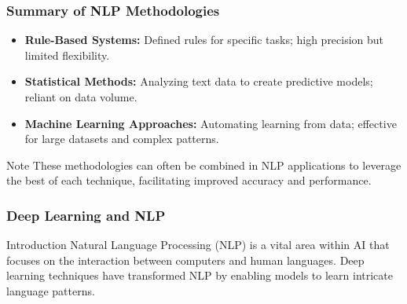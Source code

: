 \documentclass[aspectratio=169]{beamer}
\begin{document}
\begin{frame}[fragile]
    \frametitle{Summary of NLP Methodologies}
    \begin{itemize}
        \item \textbf{Rule-Based Systems:} Defined rules for specific tasks; high precision but limited flexibility.
        \item \textbf{Statistical Methods:} Analyzing text data to create predictive models; reliant on data volume.
        \item \textbf{Machine Learning Approaches:} Automating learning from data; effective for large datasets and complex patterns.
    \end{itemize}
    \begin{block}{Note}
        These methodologies can often be combined in NLP applications to leverage the best of each technique, facilitating improved accuracy and performance.
    \end{block}
\end{frame}

\begin{frame}[fragile]
    \frametitle{Deep Learning and NLP}
    \begin{block}{Introduction}
        Natural Language Processing (NLP) is a vital area within AI that focuses on the interaction between computers and human languages. 
        Deep learning techniques have transformed NLP by enabling models to learn intricate language patterns.
    \end{block}
\end{frame}
\end{document}
